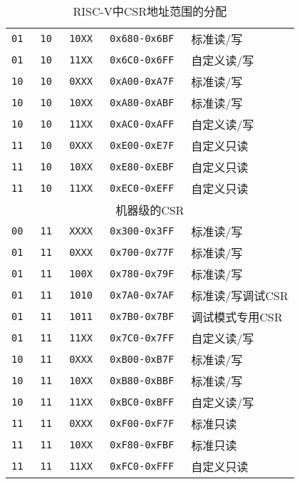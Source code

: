 \begin{table*}[h!]
\begin{center}
\begin{tabular}{|c|c|c|c|l|}
\tt   01   &\tt   10  &\tt   10XX   & \tt 0x680-0x6BF & 标准读/写 \\
\tt   01   &\tt   10  &\tt   11XX   & \tt 0x6C0-0x6FF & 自定义读/写 \\
\tt   10   &\tt   10  &\tt   0XXX   & \tt 0xA00-0xA7F & 标准读/写 \\
\tt   10   &\tt   10  &\tt   10XX   & \tt 0xA80-0xABF & 标准读/写 \\
\tt   10   &\tt   10  &\tt   11XX   & \tt 0xAC0-0xAFF & 自定义读/写 \\
\tt   11   &\tt   10  &\tt   0XXX   & \tt 0xE00-0xE7F & 自定义只读 \\
\tt   11   &\tt   10  &\tt   10XX   & \tt 0xE80-0xEBF & 自定义只读 \\
\tt   11   &\tt   10  &\tt   11XX   & \tt 0xEC0-0xEFF & 自定义只读 \\
\hline
\multicolumn{5}{|c|}{机器级的CSR}  \\
\hline
\tt   00   &\tt   11  &\tt   XXXX   & \tt 0x300-0x3FF & 标准读/写 \\
\tt   01   &\tt   11  &\tt   0XXX   & \tt 0x700-0x77F & 标准读/写 \\
\tt   01   &\tt   11  &\tt   100X   & \tt 0x780-0x79F & 标准读/写 \\
\tt   01   &\tt   11  &\tt   1010   & \tt 0x7A0-0x7AF & 标准读/写调试CSR  \\
\tt   01   &\tt   11  &\tt   1011   & \tt 0x7B0-0x7BF & 调试模式专用CSR \\
\tt   01   &\tt   11  &\tt   11XX   & \tt 0x7C0-0x7FF & 自定义读/写 \\
\tt   10   &\tt   11  &\tt   0XXX   & \tt 0xB00-0xB7F & 标准读/写 \\
\tt   10   &\tt   11  &\tt   10XX   & \tt 0xB80-0xBBF & 标准读/写 \\
\tt   10   &\tt   11  &\tt   11XX   & \tt 0xBC0-0xBFF & 自定义读/写 \\
\tt   11   &\tt   11  &\tt   0XXX   & \tt 0xF00-0xF7F & 标准只读  \\
\tt   11   &\tt   11  &\tt   10XX   & \tt 0xF80-0xFBF & 标准只读  \\
\tt   11   &\tt   11  &\tt   11XX   & \tt 0xFC0-0xFFF & 自定义只读 \\
\hline
\end{tabular}
\end{center}
\caption{RISC-V中CSR地址范围的分配
    }
\label{csrrwpriv}
\end{table*}

